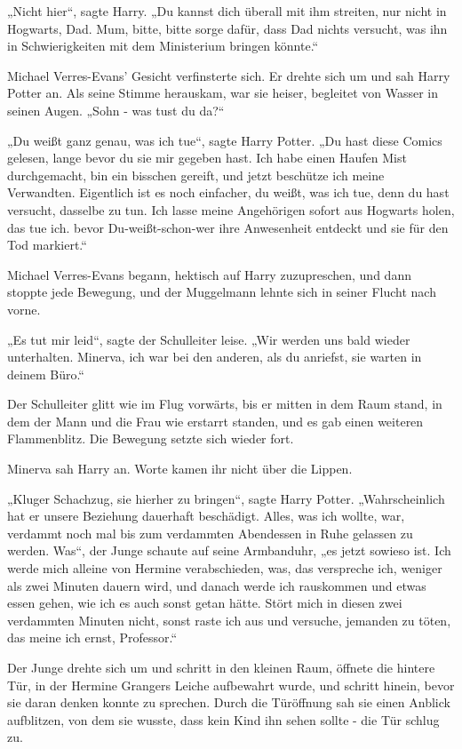 {„Nicht hier“, sagte Harry. „Du kannst dich überall mit ihm streiten, nur nicht in Hogwarts, Dad. Mum, bitte, bitte sorge dafür, dass Dad nichts versucht, was ihn in Schwierigkeiten mit dem Ministerium bringen könnte.“

Michael Verres-Evans' Gesicht verfinsterte sich. Er drehte sich um und sah Harry Potter an. Als seine Stimme herauskam, war sie heiser, begleitet von Wasser in seinen Augen. „Sohn - was tust du da?“

„Du weißt ganz genau, was ich tue“, sagte Harry Potter. „Du hast diese Comics gelesen, lange bevor du sie mir gegeben hast. Ich habe einen Haufen Mist durchgemacht, bin ein bisschen gereift, und jetzt beschütze ich meine Verwandten. Eigentlich ist es noch einfacher, du weißt, was ich tue, denn du hast versucht, dasselbe zu tun. Ich lasse meine Angehörigen sofort aus Hogwarts holen, das tue ich. bevor Du-weißt-schon-wer ihre Anwesenheit entdeckt und sie für den Tod markiert.“

Michael Verres-Evans begann, hektisch auf Harry zuzupreschen, und dann stoppte jede Bewegung, und der Muggelmann lehnte sich in seiner Flucht nach vorne.

„Es tut mir leid“, sagte der Schulleiter leise. „Wir werden uns bald wieder unterhalten. Minerva, ich war bei den anderen, als du anriefst, sie warten in deinem Büro.“

Der Schulleiter glitt wie im Flug vorwärts, bis er mitten in dem Raum stand, in dem der Mann und die Frau wie erstarrt standen, und es gab einen weiteren Flammenblitz. Die Bewegung setzte sich wieder fort.

Minerva sah Harry an. Worte kamen ihr nicht über die Lippen.

„Kluger Schachzug, sie hierher zu bringen“, sagte Harry Potter. „Wahrscheinlich hat er unsere Beziehung dauerhaft beschädigt. Alles, was ich wollte, war, verdammt noch mal bis zum verdammten Abendessen in Ruhe gelassen zu werden. Was“, der Junge schaute auf seine Armbanduhr, „es jetzt sowieso ist. Ich werde mich alleine von Hermine verabschieden, was, das verspreche ich, weniger als zwei Minuten dauern wird, und danach werde ich rauskommen und etwas essen gehen, wie ich es auch sonst getan hätte. Stört mich in diesen zwei verdammten Minuten nicht, sonst raste ich aus und versuche, jemanden zu töten, das meine ich ernst, Professor.“

Der Junge drehte sich um und schritt in den kleinen Raum, öffnete die hintere Tür, in der Hermine Grangers Leiche aufbewahrt wurde, und schritt hinein, bevor sie daran denken konnte zu sprechen. Durch die Türöffnung sah sie einen Anblick aufblitzen, von dem sie wusste, dass kein Kind ihn sehen sollte - die Tür schlug zu.

}

